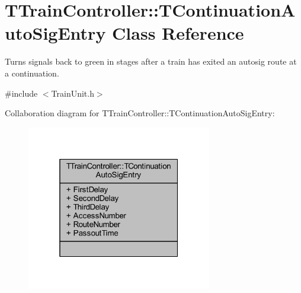 \hypertarget{class_t_train_controller_1_1_t_continuation_auto_sig_entry}{}\section{T\+Train\+Controller\+:\+:T\+Continuation\+Auto\+Sig\+Entry Class Reference}
\label{class_t_train_controller_1_1_t_continuation_auto_sig_entry}


Turns signals back to green in stages after a train has exited an autosig route at a continuation.  




{\ttfamily \#include $<$Train\+Unit.\+h$>$}



Collaboration diagram for T\+Train\+Controller\+:\+:T\+Continuation\+Auto\+Sig\+Entry\+:\nopagebreak
\begin{figure}[H]
\begin{center}
\leavevmode
\includegraphics[width=229pt]{class_t_train_controller_1_1_t_continuation_auto_sig_entry__coll__graph}
\end{center}
\end{figure}
